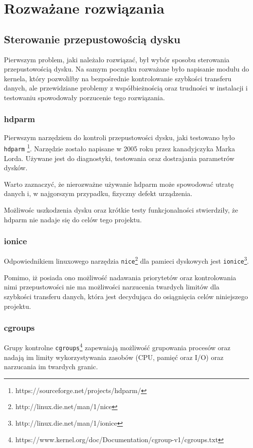 \chapter{Rozważane rozwiązania} \label{ch:prototypes}

\section{Sterowanie przepustowością dysku}\label{throttlingfailures}

Pierwszym problem, jaki należało rozwiązać, był wybór sposobu sterowania
przepustowością dysku. Na samym początku rozważane było napisanie modułu do kernela, który
pozwoliłby na bezpośrednie kontrolowanie szybkości transferu danych, ale przewidziane problemy z współbieżnością
oraz trudności w instalacji i testowaniu spowodowały porzucenie tego rozwiązania.

\subsection{hdparm}
Pierwszym narzędziem do kontroli przepustowości dysku, jaki testowano było \texttt{hdparm}
\footnote{https://sourceforge.net/projects/hdparm/}. Narzędzie zostało napisane w 2005 roku przez
kanadyjczyka Marka Lorda. Używane jest do diagnostyki, testowania oraz dostrajania parametrów dysków.

Warto zaznaczyć, że nierozważne używanie hdparm może spowodować utratę danych i, w najgorszym
przypadku, fizyczny defekt urządzenia.

Możliwośc uszkodzenia dysku oraz krótkie testy funkcjonalności stwierdziły, że hdparm nie nadaje się do celów tego projektu.

\subsection{ionice}
Odpowiednikiem linuxowego narzędzia \texttt{nice}\footnote{http://linux.die.net/man/1/nice}
dla pamieci dyskowych jest \texttt{ionice}\footnote{http://linux.die.net/man/1/ionice}.

Pomimo, iż posiada ono możliwość nadawania priorytetów oraz kontrolowania nimi przepustowości
nie ma możliwości narzucenia twardych limitów dla szybkości transferu danych, która jest 
decydująca do osiągnięcia celów niniejszego projektu.

\subsection{cgroups}
Grupy kontrolne \texttt{cgroups}\footnote{https://www.kernel.org/doc/Documentation/cgroup-v1/cgroups.txt} zapewniają możliwość grupowania procesów oraz nadają im limity wykorzystywania zasobów
(CPU, pamięć oraz I/O) oraz narzucania im twardych granic. 

